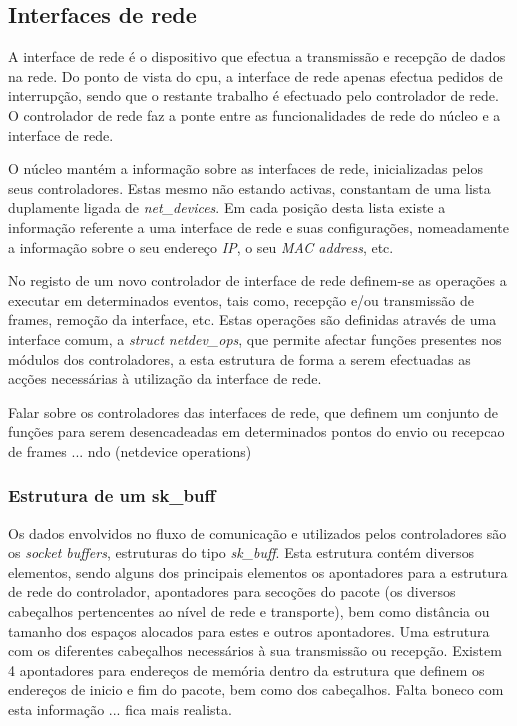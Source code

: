 \subsection{Interfaces de rede}

A interface de rede é o dispositivo que efectua a transmissão e recepção de dados na rede.
Do ponto de vista do cpu, a interface de rede apenas efectua pedidos de interrupção, sendo que o restante trabalho é efectuado pelo controlador de rede.
O controlador de rede faz a ponte entre as funcionalidades de rede do núcleo e a interface de rede.

O núcleo mantém a informação sobre as interfaces de rede, inicializadas pelos seus controladores.
Estas mesmo não estando activas, constantam de uma lista duplamente ligada de \textit{net\_devices}.
Em cada posição desta lista existe a informação referente a uma interface de rede e suas configurações, nomeadamente a informação sobre o seu endereço \textit{IP}, o seu \textit{MAC address}, etc.

No registo de um novo controlador de interface de rede definem-se as operações a executar em determinados eventos, tais como, recepção e/ou transmissão de frames, remoção da interface, etc.
Estas operações são definidas através de uma interface comum, a \textit{struct netdev\_ops}, que permite afectar funções presentes nos módulos dos controladores, a esta estrutura de forma a serem efectuadas as acções necessárias à utilização da interface de rede.

Falar sobre os controladores das interfaces de rede, que definem um conjunto de funções para serem desencadeadas em determinados pontos do envio ou recepcao de frames ... ndo (netdevice operations) 
 
\subsubsection{Estrutura de um sk\_buff}
\label{subsub:sk_buff}

Os dados envolvidos no fluxo de comunicação e utilizados pelos controladores são os \textit{socket buffers}, estruturas do tipo \textit{sk\_buff}.
Esta estrutura contém diversos elementos, sendo alguns dos principais elementos os apontadores para a estrutura de rede do controlador, apontadores para secoções do pacote (os diversos cabeçalhos pertencentes ao nível de rede e transporte), bem como distância ou tamanho dos espaços alocados para estes e outros apontadores.
Uma estrutura com os diferentes cabeçalhos necessários à sua transmissão ou recepção.
Existem 4 apontadores para endereços de memória dentro da estrutura que definem os endereços de inicio e fim do pacote, bem como dos cabeçalhos.
Falta boneco com esta informação ... fica mais realista.

